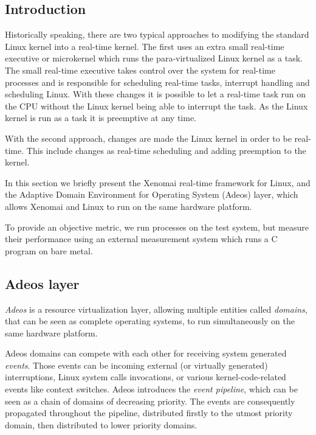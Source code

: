 \documentclass[10pt,a4paper]{article}
\begin{document}
\begin{multicols}{2}

\section{Introduction}
Historically speaking, there are two typical approaches to modifying the standard Linux kernel into a real-time kernel. The first uses an extra small real-time executive \cite{rtai} or microkernel \cite{sel4} which runs the para-virtualized Linux kernel as a task. The small real-time executive takes control over the system for real-time processes and is responsible for scheduling real-time tasks, interrupt handling and scheduling Linux. With these changes it is possible to let a real-time task run on the CPU without the Linux kernel being able to interrupt the task. As the Linux kernel is run as a task it is preemptive at any time.

With the second approach, changes are made the Linux kernel in order to be real-time. This include changes as real-time
scheduling and adding preemption to the kernel.

In this section we briefly present the Xenomai real-time framework for Linux, and the Adaptive Domain Environment for Operating System (Adeos) layer, which allows Xenomai and Linux to run on the same hardware platform.

To provide an objective metric, we run processes on the test system, but measure their performance using an external measurement system which runs a C program on bare metal.

\subsection{Adeos layer}

\textit{Adeos} is a resource virtualization layer, allowing multiple entities called \textit{domains}, that can be seen as complete operating systems, to run  simultaneously on the same hardware platform.

Adeos domains can compete with each other for receiving system generated \textit{events}. Those events can be incoming external (or virtually generated) interruptions, Linux system calls invocations, or various kernel-code-related events like context switches. Adeos introduces the \textit{event pipeline}, which can be seen as a chain of domains of decreasing priority. The events are consequently propagated throughout the pipeline, distributed firstly to the utmost priority domain, then distributed to lower priority domains.


\end{multicols}
\end{document}

